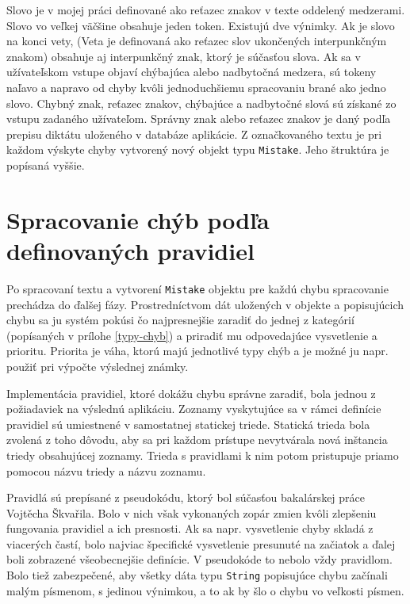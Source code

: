 \documentclass[12pt,oneside]{fithesis2}
\begin{document}
	\par Slovo je v mojej práci definované ako reťazec znakov v texte oddelený medzerami. Slovo vo veľkej väčšine obsahuje jeden token. Existujú dve výnimky. Ak je slovo na konci vety, (Veta je definovaná ako reťazec slov ukončených interpunkčným znakom) obsahuje aj interpunkčný znak, ktorý je súčasťou slova. Ak sa v užívateľskom vstupe objaví chýbajúca alebo nadbytočná medzera, sú tokeny naľavo a napravo od chyby kvôli jednoduchšiemu spracovaniu brané ako jedno slovo. Chybný znak, reťazec znakov, chýbajúce a nadbytočné slová sú získané zo vstupu zadaného užívateľom. Správny znak alebo reťazec znakov je daný podľa prepisu diktátu uloženého v databáze aplikácie. Z označkovaného textu je pri každom výskyte chyby vytvorený nový objekt typu \texttt{Mistake}. Jeho štruktúra je popísaná vyššie.
	
      \section{Spracovanie chýb podľa definovaných pravidiel}
     	  \par Po spracovaní textu a vytvorení \texttt{Mistake} objektu pre každú chybu spracovanie prechádza do ďalšej fázy. Prostredníctvom dát uložených v objekte a popisujúcich chybu sa ju systém pokúsi čo najpresnejšie zaradiť do jednej z kategórií (popísaných v prílohe \ref{typy-chyb}) a priradiť mu odpovedajúce vysvetlenie a prioritu. Priorita je váha, ktorú majú jednotlivé typy chýb a je možné ju napr. použiť pri výpočte výslednej známky.
     	  \par Implementácia pravidiel, ktoré dokážu chybu správne zaradiť, bola jednou z požiadaviek na výslednú aplikáciu. Zoznamy vyskytujúce sa v rámci definície pravidiel sú umiestnené v samostatnej statickej triede. Statická trieda bola zvolená z toho dôvodu, aby sa pri každom prístupe nevytvárala nová inštancia triedy obsahujúcej zoznamy. Trieda s pravidlami k nim potom pristupuje priamo pomocou názvu triedy a názvu zoznamu.
     	  \par Pravidlá sú prepísané z pseudokódu, ktorý bol súčasťou bakalárskej práce Vojtěcha Škvařila\cite{skvaril14}. Bolo v nich však vykonaných zopár zmien kvôli zlepšeniu fungovania pravidiel a ich presnosti. Ak sa napr. vysvetlenie chyby skladá z viacerých častí, bolo najviac špecifické vysvetlenie presunuté na začiatok a ďalej boli zobrazené všeobecnejšie definície. V pseudokóde to nebolo vždy pravidlom. Bolo tiež zabezpečené, aby všetky dáta typu \texttt{String} popisujúce chybu začínali malým písmenom, s jedinou výnimkou, a to ak by šlo o chybu vo veľkosti písmen.
\end{document}
